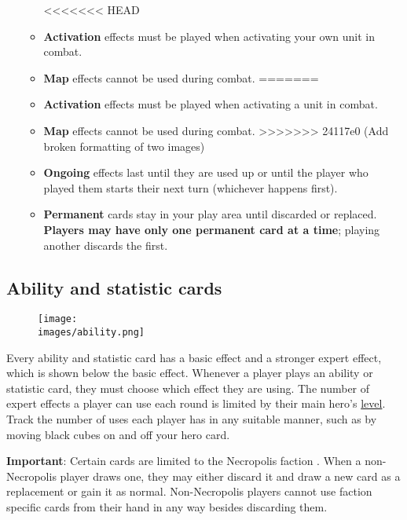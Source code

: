 \documentclass[12pt]{article}
\def\assets{assets}
\def\images{\assets/images}
\def\svgs{\assets/svgs}
\begin{document}
\begin{enumerate}
\begin{itemize}
<<<<<<< HEAD
        \item \textbf{Activation}  effects must be played when activating your own unit in combat.
        \item \textbf{Map}  effects cannot be used during combat.  
=======
        \item \textbf{Activation}  effects must be played when activating a unit in combat.
        \item \textbf{Map}  effects cannot be used during combat.
>>>>>>> 24117e0 (Add broken formatting of two images)
        \item \textbf{Ongoing}  effects last until they are used up or until the player who played them starts their next turn (whichever happens first).
        \item \textbf{Permanent}  cards stay in your play area until discarded or replaced. \textbf{Players may have only one permanent card at a time}; playing another discards the first.
    \end{itemize}

\end{enumerate}

\clearpage
\subsection*{\hypertarget{Ability}{Ability and statistic cards}}
\begin{wrapfigure}{R}{0.5\textwidth}

    \texttt{[image: \\images/ability.png]}

\end{wrapfigure}

Every ability and statistic card has a basic effect and a stronger expert effect, which is shown below the basic effect. Whenever a player plays an ability or statistic card, they must choose which effect they are using. The number of expert  effects a player can use each round is limited by their main hero’s \hyperlink{Level}{level}. Track the number of uses each player has in any suitable manner, such as by moving black cubes on and off your hero card.\par
\textbf{Important}: Certain cards are limited to the Necropolis faction . When a non-Necropolis player draws one, they may either discard it and draw a new card as a replacement or gain it as normal. Non-Necropolis players cannot use faction specific cards from their hand in any way besides discarding them.
\end{document}
